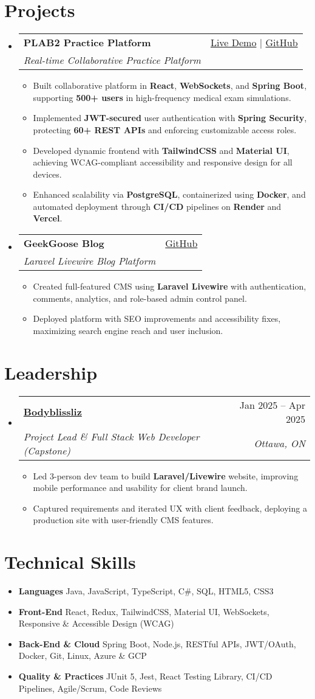 \documentclass[letterpaper,11pt]{article}
\makeatletter
\newcommand{\resumeItem}[1]{\item\small{#1 \vspace{-2pt}}}
\newcommand{\resumeSubheading}[4]{
  \vspace{-1pt}\item
    \begin{tabular*}{0.97\textwidth}[t]{l@{\extracolsep{\fill}}r}
      \textbf{#1} & #2 \\
      \textit{\small#3} & \textit{\small #4} \\
    \end{tabular*}\vspace{-5pt}
}
\newcommand{\resumeSubHeadingListStart}{\begin{itemize}[leftmargin=*]}
\newcommand{\resumeSubHeadingListEnd}{\end{itemize}}
\newcommand{\resumeItemListStart}{\begin{itemize}}
\newcommand{\resumeItemListEnd}{\end{itemize}\vspace{-5pt}}
\makeatother
\begin{document}
\section{Projects}
  \resumeSubHeadingListStart
    \resumeSubheading
      {\textbf{PLAB2 Practice Platform}}{\href{https://plab2practice.com}{Live Demo} | \href{https://github.com/altansaid/plab2projectnew}{GitHub}}
      {Real-time Collaborative Practice Platform}{}
      \resumeItemListStart
        \resumeItem{Built collaborative platform in \textbf{React}, \textbf{WebSockets}, and \textbf{Spring Boot}, supporting \textbf{500+ users} in high-frequency medical exam simulations.}
        \resumeItem{Implemented \textbf{JWT-secured} user authentication with \textbf{Spring Security}, protecting \textbf{60+ REST APIs} and enforcing customizable access roles.}
        \resumeItem{Developed dynamic frontend with \textbf{TailwindCSS} and \textbf{Material UI}, achieving WCAG-compliant accessibility and responsive design for all devices.}
        \resumeItem{Enhanced scalability via \textbf{PostgreSQL}, containerized using \textbf{Docker}, and automated deployment through \textbf{CI/CD} pipelines on \textbf{Render} and \textbf{Vercel}.}
      \resumeItemListEnd

    \resumeSubheading
      {\textbf{GeekGoose Blog}}{\href{https://github.com/altansaid/geekgoose}{GitHub}}
      {Laravel Livewire Blog Platform}{}
      \resumeItemListStart
        \resumeItem{Created full-featured CMS using \textbf{Laravel Livewire} with authentication, comments, analytics, and role-based admin control panel.}
        \resumeItem{Deployed platform with SEO improvements and accessibility fixes, maximizing search engine reach and user inclusion.}
      \resumeItemListEnd
  \resumeSubHeadingListEnd

\section{Leadership}
  \resumeSubHeadingListStart
    \resumeSubheading
      {\href{https://www.bodyblissliz.com}{Bodyblissliz}}{Jan 2025 -- Apr 2025}
      {Project Lead \& Full Stack Web Developer (Capstone)}{Ottawa, ON}
      \resumeItemListStart
        \resumeItem{Led 3-person dev team to build \textbf{Laravel/Livewire} website, improving mobile performance and usability for client brand launch.}
        \resumeItem{Captured requirements and iterated UX with client feedback, deploying a production site with user-friendly CMS features.}
      \resumeItemListEnd
  \resumeSubHeadingListEnd

\section{Technical Skills}
  \resumeItemListStart
    \resumeItem{\textbf{Languages}}{Java, JavaScript, TypeScript, C\#, SQL, HTML5, CSS3}
    \resumeItem{\textbf{Front-End}}{React, Redux, TailwindCSS, Material UI, WebSockets, Responsive \& Accessible Design (WCAG)}
    \resumeItem{\textbf{Back-End \& Cloud}}{Spring Boot, Node.js, RESTful APIs, JWT/OAuth, Docker, Git, Linux, Azure \& GCP}
    \resumeItem{\textbf{Quality \& Practices}}{JUnit 5, Jest, React Testing Library, CI/CD Pipelines, Agile/Scrum, Code Reviews}
  \resumeItemListEnd
\end{document}
